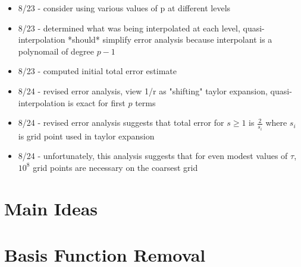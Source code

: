 \documentclass{beamer}
\begin{document}
{{\begin{itemize}
			\item 8/23 - consider using various values of p at different levels
			\item 8/23 - determined what was being interpolated at each level, quasi-interpolation *should* simplify error analysis because interpolant is a polynomail of degree $p-1$
			\item 8/23 - computed initial total error estimate
			\item 8/24 - revised error analysis, view 1/r as "shifting" taylor expansion, quasi-interpolation is exact for first $p$ terms
			\item 8/24 - revised error analysis suggests that total error for $s \geq 1$ is $\frac{2}{s_i}$ where $s_i$ is grid point used in taylor expansion
			\item 8/24 - unfortunately, this analysis suggests that for even modest values of $\tau$, $10^8$ grid points are necessary on the coarsest grid
		\end{itemize}
	}
}

\small

\section{Main Ideas}


\section{Basis Function Removal}
\end{document}

